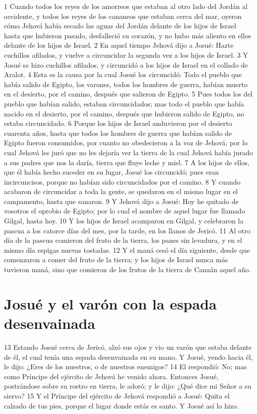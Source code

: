 1 Cuando todos los reyes de los amorreos que estaban al otro lado del Jordán al occidente, y todos los reyes de los cananeos que estaban cerca del mar, oyeron cómo Jehová había secado las aguas del Jordán delante de los hijos de Israel hasta que hubieron pasado, desfalleció su corazón, y no hubo más aliento en ellos delante de los hijos de Israel.
2 En aquel tiempo Jehová dijo a Josué: Hazte cuchillos afilados, y vuelve a circuncidar la segunda vez a los hijos de Israel.
3 Y Josué se hizo cuchillos afilados, y circuncidó a los hijos de Israel en el collado de Aralot.
4 Esta es la causa por la cual Josué los circuncidó: Todo el pueblo que había salido de Egipto, los varones, todos los hombres de guerra, habían muerto en el desierto, por el camino, después que salieron de Egipto.
5 Pues todos los del pueblo que habían salido, estaban circuncidados; mas todo el pueblo que había nacido en el desierto, por el camino, después que hubieron salido de Egipto, no estaba circuncidado.
6 Porque los hijos de Israel anduvieron por el desierto cuarenta años, hasta que todos los hombres de guerra que habían salido de Egipto fueron consumidos, por cuanto no obedecieron a la voz de Jehová; por lo cual Jehová les juró que no les dejaría ver la tierra de la cual Jehová había jurado a sus padres que nos la daría, tierra que fluye leche y miel. 
7 A los hijos de ellos, que él había hecho suceder en su lugar, Josué los circuncidó; pues eran incircuncisos, porque no habían sido circuncidados por el camino.
8 Y cuando acabaron de circuncidar a toda la gente, se quedaron en el mismo lugar en el campamento, hasta que sanaron.
9 Y Jehová dijo a Josué: Hoy he quitado de vosotros el oprobio de Egipto; por lo cual el nombre de aquel lugar fue llamado Gilgal, hasta hoy.
10 Y los hijos de Israel acamparon en Gilgal, y celebraron la pascua a los catorce días del mes, por la tarde, en los llanos de Jericó.
11 Al otro día de la pascua comieron del fruto de la tierra, los panes sin levadura, y en el mismo día espigas nuevas tostadas.
12 Y el maná cesó el día siguiente, desde que comenzaron a comer del fruto de la tierra; y los hijos de Israel nunca más tuvieron maná, sino que comieron de los frutos de la tierra de Canaán aquel año.

\section*{Josué y el varón con la espada desenvainada}

13 Estando Josué cerca de Jericó, alzó sus ojos y vio un varón que estaba delante de él, el cual tenía una espada desenvainada en su mano. Y Josué, yendo hacia él, le dijo: ¿Eres de los nuestros, o de nuestros enemigos?
14 El respondió: No; mas como Príncipe del ejército de Jehová he venido ahora. Entonces Josué, postrándose sobre su rostro en tierra, le adoró; y le dijo: ¿Qué dice mi Señor a su siervo?
15 Y el Príncipe del ejército de Jehová respondió a Josué: Quita el calzado de tus pies, porque el lugar donde estás es santo. Y Josué así lo hizo.

